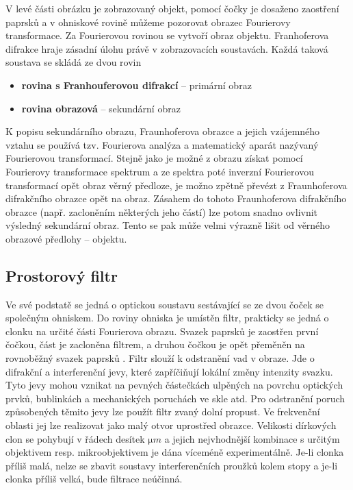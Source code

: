\documentclass[11pt,a4paper]{article}
\begin{document}
V levé části obrázku je zobrazovaný objekt, pomocí čočky je dosaženo zaostření paprsků a v ohniskové
rovině můžeme pozorovat obrazec Fourierovy transformace. Za Fourierovou rovinou se vytvoří obraz objektu. 
Franhoferova difrakce hraje zásadní úlohu právě v zobrazovacích soustavách. Každá taková soustava
se skládá ze dvou rovin

\begin{itemize}
\item \textbf{rovina s Franhouferovou difrakcí} -- primární obraz
\item \textbf{rovina obrazová} -- sekundární obraz
\end{itemize} 

K popisu sekundárního obrazu, Fraunhoferova obrazce a jejich vzájemného vztahu se používá tzv. 
Fourierova analýza a matematický aparát nazývaný Fourierovou transformací. 
Stejně jako je možné z obrazu získat pomocí Fourierovy transformace spektrum a ze spektra poté
inverzní Fourierovou transformací opět obraz věrný předloze, je možno zpětně převézt z Fraunhoferova 
difrakčního obrazce opět na obraz.
Zásahem do tohoto Fraunhoferova difrakčního obrazce (např. zacloněním 
některých jeho částí) lze potom snadno ovlivnit výsledný sekundární obraz. Tento se pak může 
velmi výrazně lišit od věrného obrazové předlohy -- objektu. 

\subsection{Prostorový filtr}
Ve své podstatě se jedná o optickou soustavu sestávající se ze dvou čoček se společným ohniskem.
Do roviny ohniska je umístěn filtr, prakticky se jedná o clonku na určité části Fourierova obrazu.
Svazek paprsků je zaostřen první čočkou, část je zacloněna filtrem, a druhou čočkou je opět přeměněn
na rovnoběžný svazek paprsků \cite{prost-filt}.
Filtr slouží k odstranění vad v obraze. Jde o difrakční a interferenční jevy,
které zapříčiňují lokální změny intenzity svazku. Tyto jevy mohou vznikat na pevných
částečkách ulpěných na povrchu optických prvků, bublinkách a mechanických poruchách ve skle
atd. Pro odstranění poruch způsobených těmito jevy lze použít filtr zvaný dolní propust. Ve frekvenční oblasti
jej lze realizovat jako malý otvor uprostřed obrazce. 
Velikosti dírkových clon se pohybují v řádech desítek $\si{\micro} m$ a jejich nejvhodnější
kombinace s určitým objektivem resp. mikroobjektivem je dána víceméně experimentálně. Je-li
clonka příliš malá, nelze se zbavit soustavy interferenčních proužků kolem stopy a je-li clonka
příliš velká, bude filtrace neúčinná.
\end{document}

